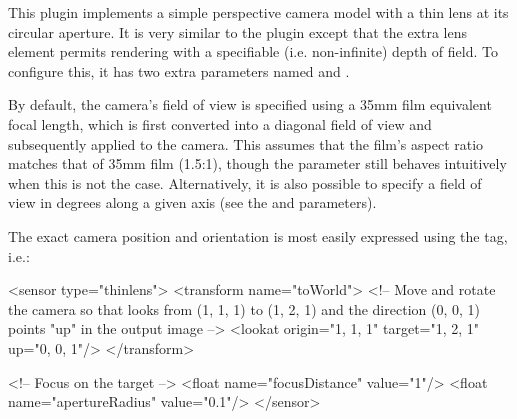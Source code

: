 
This plugin implements a simple perspective camera model with a thin lens
at its circular aperture. It is very similar to the  plugin
except that the extra lens element permits rendering with a
specifiable (i.e. non-infinite) depth of field. To configure this, it has two
extra parameters named  and .

By default, the camera's field of view is specified using a 35mm film
equivalent focal length, which is first converted into a diagonal field
of view and subsequently applied to the camera. This assumes that
the film's aspect ratio matches that of 35mm film (1.5:1), though the
parameter still behaves intuitively when this is not the case.
Alternatively, it is also possible to specify a field of view in degrees
along a given axis (see the  and  parameters).

The exact camera position and orientation is most easily expressed using the
 tag, i.e.:
\begin{xml}
<sensor type="thinlens">
    <transform name="toWorld">
        <!-- Move and rotate the camera so that looks from (1, 1, 1) to (1, 2, 1)
             and the direction (0, 0, 1) points "up" in the output image -->
        <lookat origin="1, 1, 1" target="1, 2, 1" up="0, 0, 1"/>
    </transform>

    <!-- Focus on the target -->
    <float name="focusDistance" value="1"/>
    <float name="apertureRadius" value="0.1"/>
</sensor>
\end{xml}

